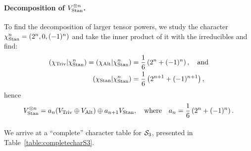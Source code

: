 {\begin{example}
%	
	
	\paragraph{Decomposition of $V_{\text{Stan}}^{\otimes n}$.}\cite[Exercise 2.7.]{FultonHarris} To find the decomposition of larger tensor powers, we study the character $\chi_{\text{Stan}}^n = (2^n, 0, (-1)^n)$ and take the inner product of it with the irreducibles and find:
	\begin{align*}
		({\chi_{\text{Triv}}}|\chi_{\text{Stan}}^n) = ({\chi_{\text{Alt}}}|\chi_{\text{Stan}}^n) &= \frac{1}{6}\left(2^n + (-1)^n\right), \quad \text{and}\\
		({\chi_{\text{Stan}}}|\chi_{\text{Stan}}^n) &= \frac{1}{6}\left(2^{n+1} + (-1)^{n+1}\right), 
	\end{align*}
	hence \begin{align*}
		V_{\text{Stan}}^{\otimes n} = a_n (V_{\text{Triv}} \oplus V_{\text{Alt}}) \oplus a_{n+1} V_{\text{Stan}}, \quad \text{where} \quad a_n = \frac{1}{6}\left(2^n + (-1)^n\right).
	\end{align*} 
\end{example}

	\paragraph{} We arrive at a ``complete'' character table for $\mathcal{S}_3$, presented in Table~\ref{table:completecharS3}.
	
	\begin{table}[hbt!]
		\centering
		

\end{table}}
